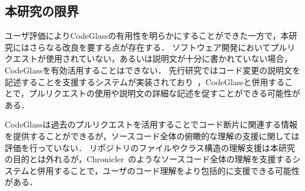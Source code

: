 \subsection{本研究の限界}

ユーザ評価によりCodeGlassの有用性を明らかにすることができた一方で，本研究にはさらなる改良を要する点が存在する．
ソフトウェア開発においてプルリクエストが使用されていない，あるいは説明文が十分に書かれていない場合，CodeGlassを有効活用することはできない．
先行研究ではコード変更の説明文を記述することを支援するシステムが実装されており~\cite{ChangeScribe}，CodeGlassと併用することで，プルリクエストの使用や説明文の詳細な記述を促すことができる可能性がある．


CodeGlassは過去のプルリクエストを活用することでコード断片に関連する情報を提供することができるが，ソースコード全体の俯瞰的な理解の支援に関しては評価を行っていない．
リポジトリのファイルやクラス構造の理解支援は本研究の目的とは外れるが，Chronicler~\cite{Chronicler}のようなソースコード全体の理解を支援するシステムと併用することで，ユーザのコード理解をより包括的に支援できる可能性がある．





